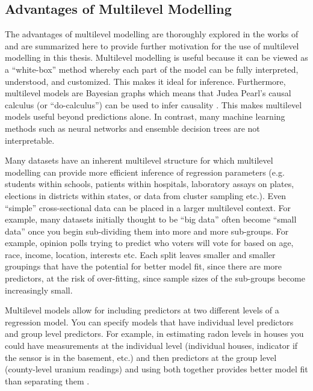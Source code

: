 \subsection*{Advantages of Multilevel Modelling}

The advantages of multilevel modelling are thoroughly explored in the works of \cite{Gelman2014} \cite{Gelman2006} \cite{McElreath2020} and are summarized here to provide further motivation for the use of multilevel modelling in this thesis. Multilevel modelling is useful because it can be viewed as a ``white-box'' method whereby each part of the model can be fully interpreted, understood, and customized. This makes it ideal for inference. Furthermore, multilevel models are Bayesian graphs which means that Judea Pearl’s causal calculus (or ``do-calculus'') can be used to infer causality \cite{Pearl2000}. This makes multilevel models useful beyond predictions alone. In contrast, many machine learning methods such as neural networks and ensemble decision trees are not interpretable.

Many datasets have an inherent multilevel structure for which multilevel modelling can provide more efficient inference of regression parameters (e.g. students within schools, patients within hospitals, laboratory assays on plates, elections in districts within states, or data from cluster sampling etc.). Even ``simple'' cross-sectional data can be placed in a larger multilevel context. For example, many datasets initially thought to be ``big data'' often become ``small data'' once you begin sub-dividing them into more and more sub-groups. For example, opinion polls trying to predict who voters will vote for based on age, race, income, location, interests etc. Each split leaves smaller and smaller groupings that have the potential for better model fit, since there are more predictors, at the risk of over-fitting, since sample sizes of the sub-groups become increasingly small.

Multilevel models allow for including predictors at two different levels of a regression model. You can specify models that have individual level predictors and group level predictors. For example, in estimating radon levels in houses you could have measurements at the individual level (individual houses, indicator if the sensor is in the basement, etc.) and then predictors at the group level (county-level uranium readings) and using both together provides better model fit than separating them \cite{Gelman2006b}.

